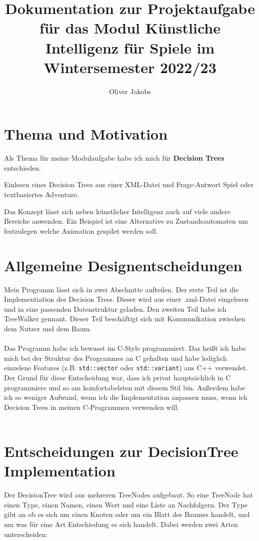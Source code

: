 \documentclass[a4paper,12pt]{article}
\title{Dokumentation zur Projektaufgabe für das Modul Künstliche Intelligenz für Spiele im Wintersemester 2022/23}
\author{Oliver Jakobs}
\begin{document}
\maketitle

\section*{Thema und Motivation}

Als Thema für meine Modulaufgabe habe ich mich für \textbf{Decision Trees} entschieden. 

Einlesen eines Decision Trees aus einer XML-Datei und Frage-Antwort Spiel oder textbasiertes Adventure.

Das Konzept lässt sich neben künstlicher Intelligenz auch auf viele andere Bereiche anwenden. Ein Beispiel ist eine Alternative zu Zustandsautomaten um festzulegen welche Animation gespilet werden soll.

\newpage

\section*{Allgemeine Designentscheidungen}

Mein Programm lässt sich in zwei Abschnitte aufteilen. Der erste Teil ist die Implementiation des Decision Tress. Dieser wird aus einer .xml-Datei eingelesen und in eine passenden Datenstruktur geladen. 
Den zweiten Teil habe ich TreeWalker gennant. Dieser Teil beschäftigt sich mit Kommunikation zwischen dem Nutzer und dem Baum. 
\\
\\
Das Programm habe ich bewusst im C-Style programmiert. Das heißt ich habe mich bei der Struktur des Programmes an C gehalten und habe lediglich einzelene Features (z.B. \texttt{std::vector} oder \texttt{std::variant}) aus C++ verwendet.
Der Grund für diese Entscheidung war, dass ich privat hauptsächlich in C programmiere und so am komfortabelsten mit diesem Stil bin. Außerdem habe ich so weniger Aufwand, wenn ich die Implementation anpassen muss, wenn ich Decision Trees in meinen C-Programmen verwenden will.
\\
\\

\section*{Entscheidungen zur DecisionTree Implementation}
Der DecisionTree wird aus mehreren TreeNodes aufgebaut. So eine TreeNode hat einen Type, einen Namen, einen Wert und eine Liste an Nachfolgern. Der Type gibt an ob es sich um einen Knoten oder um ein Blatt des Baumes handelt, und um was für eine Art Entschiedung es sich handelt. Dabei werden zwei Arten unterscheiden: 
\end{document}
